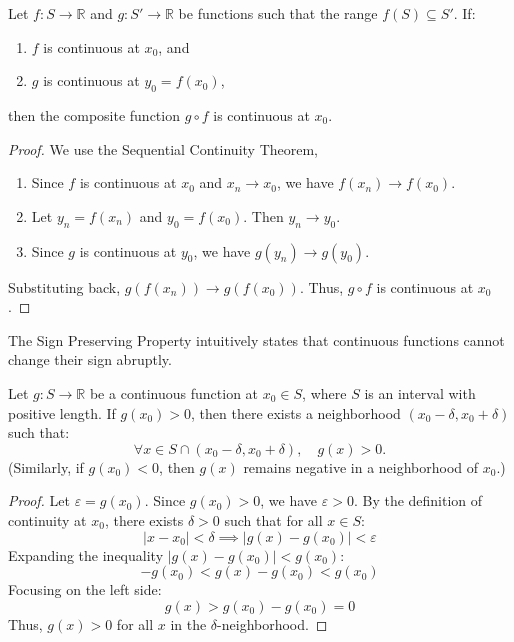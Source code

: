 \documentclass[
	UTF-8,
	11pt, %
	a4paper, %
]{LegrandOrangeBook}
\begin{document}
    \begin{theorem}
    Let $f: S \to \mathbb{R}$ and $g: S' \to \mathbb{R}$ be functions such that the range $f(S) \subseteq S'$.
    If:
    \begin{enumerate}
        \item $f$ is continuous at $x_0$, and
        \item $g$ is continuous at $y_0 = f(x_0)$,
    \end{enumerate}
    then the composite function $g \circ f$ is continuous at $x_0$.

    \end{theorem}

    \begin{proof}
    We use the Sequential Continuity Theorem,
    \begin{enumerate}
        \item Since $f$ is continuous at $x_0$ and $x_n \to x_0$, we have $f(x_n) \to f(x_0)$.
        \item Let $y_n = f(x_n)$ and $y_0 = f(x_0)$. Then $y_n \to y_0$.
        \item Since $g$ is continuous at $y_0$, we have $g(y_n) \to g(y_0)$.
    \end{enumerate}
    Substituting back, $g(f(x_n)) \to g(f(x_0))$. Thus, $g \circ f$ is continuous at $x_0$.
    \end{proof}

    
    The Sign Preserving Property intuitively states that continuous functions cannot change their 
    sign abruptly.

    \begin{theorem}
    Let $g: S \to \mathbb{R}$ be a continuous function at $x_0 \in S$, where $S$ is an interval with positive length.
    If $g(x_0) > 0$, then there exists a neighborhood $(x_0 - \delta, x_0 + \delta)$ such that:
    \[ \forall x \in S \cap (x_0 - \delta, x_0 + \delta), \quad g(x) > 0. \]
    (Similarly, if $g(x_0) < 0$, then $g(x)$ remains negative in a neighborhood of $x_0$.)
    \end{theorem}

    \begin{proof}
    Let $\varepsilon = g(x_0)$. Since $g(x_0) > 0$, we have $\varepsilon > 0$.
    By the definition of continuity at $x_0$, there exists $\delta > 0$ such that for all $x \in S$:
    \[ |x - x_0| < \delta \implies |g(x) - g(x_0)| < \varepsilon \]
    Expanding the inequality $|g(x) - g(x_0)| < g(x_0)$:
    \[ -g(x_0) < g(x) - g(x_0) < g(x_0) \]
    Focusing on the left side:
    \[ g(x) > g(x_0) - g(x_0) = 0 \]
    Thus, $g(x) > 0$ for all $x$ in the $\delta$-neighborhood.
    \end{proof}
    
\end{document}
